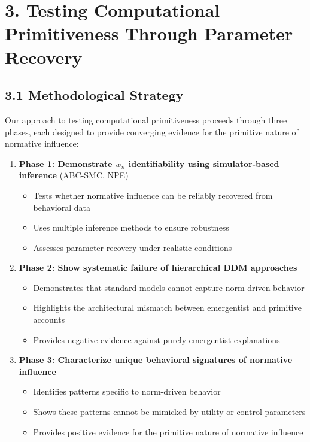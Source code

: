 \documentclass[
  11pt,
]{article}
\providecommand{\tightlist}{%
  \setlength{\itemsep}{0pt}\setlength{\parskip}{0pt}}
\begin{document}
\section{3. Testing Computational Primitiveness Through Parameter
Recovery}\label{testing-computational-primitiveness-through-parameter-recovery}

\subsection{3.1 Methodological Strategy}\label{methodological-strategy}

Our approach to testing computational primitiveness proceeds through
three phases, each designed to provide converging evidence for the
primitive nature of normative influence:

\begin{enumerate}
\def\labelenumi{\arabic{enumi}.}
\tightlist
\item
  \textbf{Phase 1: Demonstrate \(w_n\) identifiability using
  simulator-based inference} (ABC-SMC, NPE)

  \begin{itemize}
  \tightlist
  \item
    Tests whether normative influence can be reliably recovered from
    behavioral data
  \item
    Uses multiple inference methods to ensure robustness
  \item
    Assesses parameter recovery under realistic conditions
  \end{itemize}
\item
  \textbf{Phase 2: Show systematic failure of hierarchical DDM
  approaches}

  \begin{itemize}
  \tightlist
  \item
    Demonstrates that standard models cannot capture norm-driven
    behavior
  \item
    Highlights the architectural mismatch between emergentist and
    primitive accounts
  \item
    Provides negative evidence against purely emergentist explanations
  \end{itemize}
\item
  \textbf{Phase 3: Characterize unique behavioral signatures of
  normative influence}

  \begin{itemize}
  \tightlist
  \item
    Identifies patterns specific to norm-driven behavior
  \item
    Shows these patterns cannot be mimicked by utility or control
    parameters
  \item
    Provides positive evidence for the primitive nature of normative
    influence
  \end{itemize}
\end{enumerate}
\end{document}
